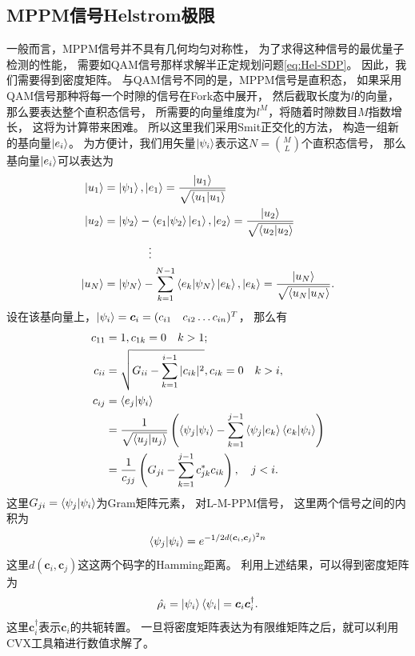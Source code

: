 \subsection{MPPM信号Helstrom极限}
一般而言，MPPM信号并不具有几何均匀对称性，
为了求得这种信号的最优量子检测的性能，
需要如QAM信号那样求解半正定规划问题\ref{eq:Hel-SDP}。
因此，我们需要得到密度矩阵。
与QAM信号不同的是，MPPM信号是直积态，
如果采用QAM信号那种将每一个时隙的信号在Fork态中展开，
然后截取长度为$l$的向量，那么要表达整个直积态信号，
所需要的向量维度为$l^M$，将随着时隙数目$M$指数增长，
这将为计算带来困难。
所以这里我们采用Smit正交化的方法\cite{lzw2010LA,zyh2007szjsff}，
构造一组新的基向量$\ket{e_i}$。
为方便计，我们用矢量$\ket{\psi_i}$表示这$N = \binom{M}{L}$个直积态信号，
那么基向量$\ket{e_i}$可以表达为
\begin{equation}
\begin{split}
\ket{u_1} &= \ket{\psi_1}, \ket{e_1} = \frac{\ket{u_1}}{\sqrt{\bra{u_1}\ket{u_1}}}\\
\ket{u_2} &= \ket{\psi_2} - \bra{e_1}\ket{\psi_2}\ket{e_1}, \ket{e_2} = \frac{\ket{u_2}}{\sqrt{\bra{u_2}\ket{u_2}}}\\
          &\qquad\qquad \vdots \\
\ket{u_N} &= \ket{\psi_N} - \sum_{k=1}^{N-1} \bra{e_k}\ket{\psi_N}\ket{e_k}, \ket{e_k} = \frac{\ket{u_N}}{\sqrt{\bra{u_N}\ket{u_N}}}.
\end{split}
\end{equation}
设在该基向量上，$\ket{\psi_i} =\bm{c}_i = (c_{i1} \quad c_{i2} \dots c_{in})^T$，
那么有
\begin{equation}
\begin{split}
c_{11} &= 1, c_{1k}=0 \quad k>1; \\
c_{ii} &= \sqrt{G_{ii} - \sum_{k=1}^{i-1} |c_{ik}|^2 }, c_{ik}=0 \quad k>i, \\
c_{ij} &= \bra{e_j}\ket{\psi_i} \\
       &= \frac{1}{\sqrt{\bra{u_j}\ket{u_j}}} \left( \bra{\psi_j}\ket{\psi_i} - \sum_{k=1}^{j-1} \bra{\psi_j}\ket{e_k} \bra{e_k}\ket{\psi_i} \right)\\
       &= \frac{1}{c_{jj}} \left( G_{ji} - \sum_{k=1}^{j-1} c_{jk}^* c_{ik} \right), \quad j<i.
\end{split}
\end{equation}
这里$G_{ji}=\bra{\psi_j}\ket{\psi_i}$为Gram矩阵元素，
对L-M-PPM信号，
这里两个信号之间的内积为
\begin{equation}
\bra{\psi_j}\ket{\psi_i}=e^{-1/2 d(\bm{c}_i, \bm{c}_j)^2 n}
\end{equation}
这里$d(\bm{c}_i, \bm{c}_j)$这这两个码字的Hamming距离。
利用上述结果，可以得到密度矩阵为
\begin{equation}
\hat{\rho_i} = \ket{\psi_i}\bra{\psi_i} = \bm{c}_i \bm{c}_i^\dagger.
\end{equation}
这里$\bm{c}_i^\dagger$表示$\bm{c}_i$的共轭转置。
一旦将密度矩阵表达为有限维矩阵之后，就可以利用CVX工具箱\cite{cvx,gb08}进行数值求解了。

